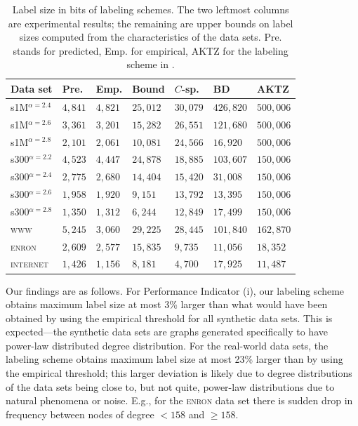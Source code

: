 \begin{table}
\small
\begin{tabular}{l|llllll}
Data set             &Pre. &Emp. & Bound     &$C$-sp. &BD \cite{adjiashvili2014labeling} &AKTZ\\\hline
s1M$^{\alpha=2.4}$  &$4,841$    &$4,821$    & $25,012 $ &$30,079$     &$426,820$ &$500,006$\\\hline
s1M$^{\alpha=2.6}$  &$3,361$    &$3,201$    & $15,282 $ &$26,551$     &$121,680$ &$500,006$\\\hline
s1M$^{\alpha=2.8}$  &$2,101$    &$2,061$    & $10,081 $ &$24,566$     &$16,920$  &$500,006$\\\hline
s300$^{\alpha=2.2}$ &$4,523$    &$4,447$    & $24,878 $ &$18,885$     &$103,607$ &$150,006$\\\hline
s300$^{\alpha=2.4}$ &$2,775$    &$2,680$    & $14,404 $ &$15,420$     &$31,008$  &$150,006$\\\hline
s300$^{\alpha=2.6}$ &$1,958$    &$1,920$    & $9,151 $  &$13,792$     &$13,395$  &$150,006$\\\hline
s300$^{\alpha=2.8}$ &$1,350$    &$1,312$    & $6,244 $  &$12,849$     &$17,499$  &$150,006$\\\hline
\textsc{www}        &$5,245$    &$3,060$    & $29,225 $ &$28,445$     &$101,840$ &$162,870$ \\\hline
\textsc{enron}      &$2,609$    &$2,577$    & $15,835 $ &$9,735$      &$11,056$  &$18,352$\\\hline
\textsc{internet}   &$1,426$    &$1,156$    & $8,181 $  &$4,700$      &$17,925$  &$11,487$\\\hline 
\end{tabular}
\caption{Label size in bits of labeling schemes. The two leftmost columns are experimental results; the remaining are upper bounds on label sizes computed from the characteristics of the data sets.
		Pre. stands for predicted, Emp. for empirical, AKTZ for the labeling scheme in \cite{alstrup2014adjacency}.}
\label{t:labelsizes}
\end{table}

Our findings are as follows. For Performance Indicator (i), our labeling scheme obtains maximum label size at most 3\% larger than what would have been obtained by using the empirical threshold for all synthetic data sets.
This is expected---the synthetic data sets are graphs generated specifically to have power-law distributed degree distribution. For the real-world data sets, the labeling scheme
obtains maximum label size at most 23\% larger than by using the empirical threshold; this larger deviation is likely due to degree distributions of the data sets being close to, but not quite,
power-law distributions due to natural phenomena or noise. E.g., for the \textsc{enron} data set there is sudden drop in frequency between nodes of degree $< 158$ and $\geq 158$.

